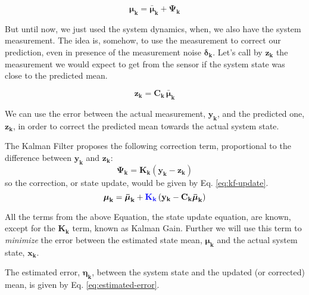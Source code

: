 \documentclass[12pt]{article}
\newcommand{\bvec}[1]{\mathbf{#1}} %
\newcommand{\mat}[1]{\mathbf{#1}}
\newcommand{\parentheses}[1]{\left(#1\right)}
\newcommand{\mb}[1]{{\boldsymbol{#1}}} %
\newcommand{\blue}[1]{\color{blue}#1\color{black}}
\begin{document}
\begin{equation}
    \mb{\mu}_\mathbf{k} = \mb{\bar{\mu}}_\mathbf{k} + \mat{\Psi_k}
\end{equation}

But until now, we just used the system dynamics, when, we also have the system measurement. The idea is, somehow, to use the measurement to correct our prediction, even in presence of the measurement noise $\mb{\delta}_\mathbf{k}$. Let's call by $\bvec{z_k}$ the measurement we would expect to get from the sensor if the system state was close to the predicted mean.

\begin{equation}
    \bvec{z_k} = \mat{C_k}\, \mb{\bar{\mu}}_\mathbf{k}
\end{equation}

We can use the error between the actual measurement, $\bvec{y_k}$, and the predicted one, $\bvec{z_k}$, in order to correct the predicted mean towards the actual system state. 

The Kalman Filter proposes the following correction term, proportional to the difference between $\bvec{y_k}$ and $\bvec{z_k}$:
\begin{equation}
    \mat{\Psi_k} = \mat{K_k}\parentheses{\bvec{y_k} - \bvec{z_k}}
    \label{eq:kalman-correction-term}
\end{equation}
so the correction, or state update, would be given by Eq. \ref{eq:kf-update}.
\begin{equation}
    \mb{\mu}_\mathbf{k} = \mb{\bar{\mu}}_\mathbf{k} + \blue{\mat{K_k}}\parentheses{\bvec{y_k} - \mat{C_k}\mb{\bar{\mu}}_\mathbf{k}}
    \label{eq:kf-update}
\end{equation}

All the terms from the above Equation, the state update equation, are known, except for the $\mat{K_k}$ term, known as Kalman Gain. Further we will use this term to \emph{minimize} the error between the estimated state mean, $\mb{\mu}_\mathbf{k}$ and the actual system state, $\bvec{x_k}$.

The estimated error, $\mb{\eta}_\mathbf{k}$, between the system state and the updated (or corrected) mean, is given by Eq. \ref{eq:estimated-error}.
\end{document}
